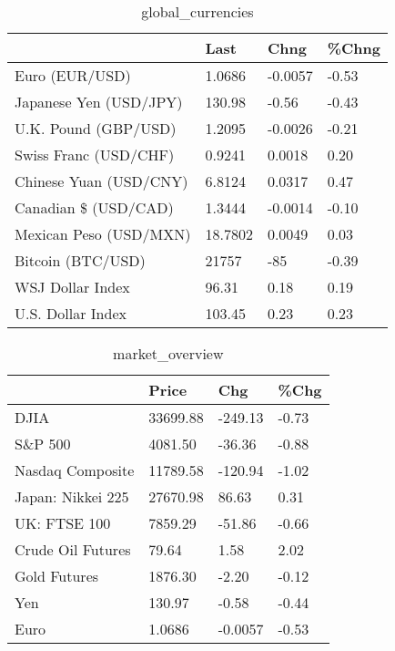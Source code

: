 \documentclass{article}%
\begin{document}
%


\begin{table}[htbp]%
\caption{global\_currencies}%
\centering%
\begin{adjustbox}{width=1\textwidth}%
\begin{tabular}{llll}
\toprule
                       &    Last &    Chng & \%Chng \\
\midrule
        Euro (EUR/USD) &  1.0686 & -0.0057 & -0.53 \\
Japanese Yen (USD/JPY) &  130.98 &   -0.56 & -0.43 \\
  U.K. Pound (GBP/USD) &  1.2095 & -0.0026 & -0.21 \\
 Swiss Franc (USD/CHF) &  0.9241 &  0.0018 &  0.20 \\
Chinese Yuan (USD/CNY) &  6.8124 &  0.0317 &  0.47 \\
  Canadian \$ (USD/CAD) &  1.3444 & -0.0014 & -0.10 \\
Mexican Peso (USD/MXN) & 18.7802 &  0.0049 &  0.03 \\
     Bitcoin (BTC/USD) &   21757 &     -85 & -0.39 \\
      WSJ Dollar Index &   96.31 &    0.18 &  0.19 \\
     U.S. Dollar Index &  103.45 &    0.23 &  0.23 \\
\bottomrule
\end{tabular}
%
\end{adjustbox}%
\end{table}

%


\begin{table}[htbp]%
\caption{market\_overview}%
\centering%
\begin{adjustbox}{width=1\textwidth}%
\begin{tabular}{llll}
\toprule
                  &    Price &     Chg &  \%Chg \\
\midrule
             DJIA & 33699.88 & -249.13 & -0.73 \\
          S\&P 500 &  4081.50 &  -36.36 & -0.88 \\
 Nasdaq Composite & 11789.58 & -120.94 & -1.02 \\
Japan: Nikkei 225 & 27670.98 &   86.63 &  0.31 \\
     UK: FTSE 100 &  7859.29 &  -51.86 & -0.66 \\
Crude Oil Futures &    79.64 &    1.58 &  2.02 \\
     Gold Futures &  1876.30 &   -2.20 & -0.12 \\
              Yen &   130.97 &   -0.58 & -0.44 \\
             Euro &   1.0686 & -0.0057 & -0.53 \\
\bottomrule
\end{tabular}
%
\end{adjustbox}%
\end{table}

%
\end{document}
